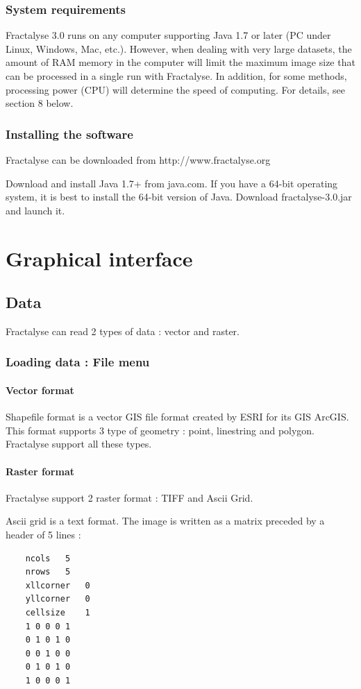 \documentclass[a4paper,10pt]{report}
\begin{document}
\section{System requirements}
Fractalyse 3.0 runs on any computer supporting Java 1.7 or later (PC under Linux, Windows, Mac, etc.). However,
when dealing with very large datasets, the amount of RAM memory in the computer will limit the maximum image size that can be processed in a single run with Fractalyse. In addition, for some methods, processing power (CPU) will determine the speed of computing. For details, see section 8 below.
\section{Installing the software}
Fractalyse can be downloaded from http://www.fractalyse.org

Download and install Java 1.7+ from java.com. If you have a 64-bit operating system, it is best to install the 64-bit version of Java.
Download fractalyse-3.0.jar and launch it.


\part{Graphical interface}

\chapter{Data}
Fractalyse can read 2 types of data : vector and raster.
\section{Loading data : File menu}
\subsection{Vector format}
Shapefile format is a vector GIS file format created by ESRI for its GIS ArcGIS.
This format supports 3 type of geometry : point, linestring and polygon.
Fractalyse support all these types. 
\subsection{Raster format}
Fractalyse support 2 raster format : TIFF and Ascii Grid.

Ascii grid is a text format. The image is written as a matrix preceded by a header of 5 lines :
\begin{Verbatim}
	ncols	5
	nrows	5
	xllcorner	0
	yllcorner	0
	cellsize	1
	1 0 0 0 1
	0 1 0 1 0
	0 0 1 0 0
	0 1 0 1 0
	1 0 0 0 1
\end{Verbatim}
\end{document}
